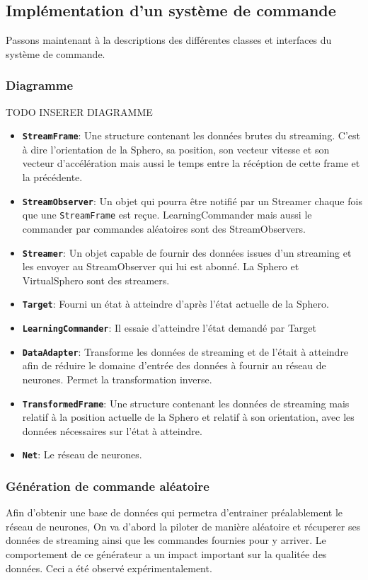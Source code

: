 \subsection{Implémentation d'un système de commande}
Passons maintenant à la descriptions des différentes classes et interfaces du système de commande.

\newcommand{\classname}[1]{\textbf{\texttt{#1}}}
\subsubsection{Diagramme}
TODO INSERER DIAGRAMME
\begin{itemize}
 \item \classname{StreamFrame}: Une structure contenant les données brutes du streaming.
  C'est à dire l'orientation de la Sphero, sa position, son vecteur vitesse et son vecteur d'accélération mais aussi le temps entre la récéption de cette frame et la précédente.
 \item \classname{StreamObserver}: Un objet qui pourra être notifié par un Streamer chaque fois que une \texttt{StreamFrame} est reçue.
  LearningCommander mais aussi le commander par commandes aléatoires sont des StreamObservers.
 \item \classname{Streamer}: Un objet capable de fournir des données issues d'un streaming et les envoyer au StreamObserver qui lui est abonné.
  La Sphero et VirtualSphero sont des streamers.
 \item \classname{Target}: Fourni un état à atteindre d'après l'état actuelle de la Sphero.
 \item \classname{LearningCommander}: Il essaie d'atteindre l'état demandé par Target
 \item \classname{DataAdapter}: Transforme les données de streaming et de l'était à atteindre afin de réduire le domaine d'entrée des données à fournir au réseau de neurones.
  Permet la transformation inverse.
 \item \classname{TransformedFrame}: Une structure contenant les données de streaming mais relatif à la position actuelle de la Sphero et relatif à son orientation,
  avec les données nécessaires sur l'état à atteindre.
 \item \classname{Net}: Le réseau de neurones.
\end{itemize}

\subsubsection{Génération de commande aléatoire}
Afin d'obtenir une base de données qui permetra d'entrainer préalablement le réseau de neurones,
On va d'abord la piloter de manière aléatoire et récuperer ses données de streaming ainsi que les commandes fournies pour y arriver.
Le comportement de ce générateur a un impact important sur la qualitée des données.
Ceci a été observé expérimentalement.


